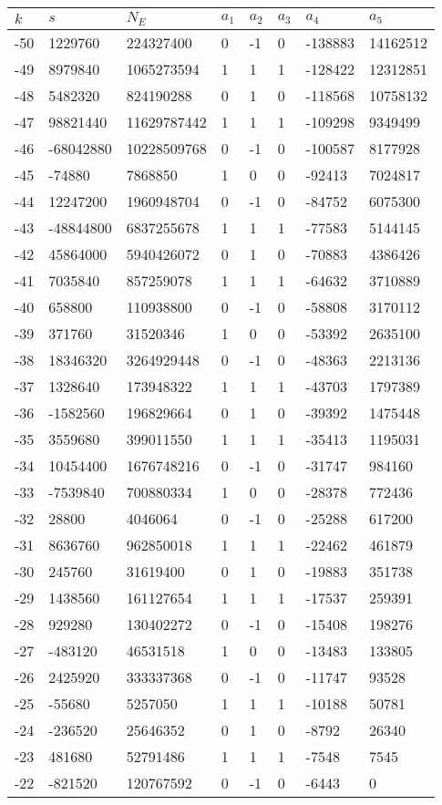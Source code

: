 \documentclass{amsart}
\begin{document}
\begin{longtable}{|l|l|l|lllll|}
\hline
$k$ & $s$ & $N_E$ & $a_1$ & $a_2$ & $a_3$ & $a_4$ & $a_5$\\
\hline
-50&1229760&224327400&0&-1&0&-138883&14162512\\
-49&8979840&1065273594&1&1&1&-128422&12312851\\
-48&5482320&824190288&0&1&0&-118568&10758132\\
-47&98821440&11629787442&1&1&1&-109298&9349499\\
-46&-68042880&10228509768&0&-1&0&-100587&8177928\\
-45&-74880&7868850&1&0&0&-92413&7024817\\
-44&12247200&1960948704&0&-1&0&-84752&6075300\\
-43&-48844800&6837255678&1&1&1&-77583&5144145\\
-42&45864000&5940426072&0&1&0&-70883&4386426\\
-41&7035840&857259078&1&1&1&-64632&3710889\\
-40&658800&110938800&0&-1&0&-58808&3170112\\
-39&371760&31520346&1&0&0&-53392&2635100\\
-38&18346320&3264929448&0&-1&0&-48363&2213136\\
-37&1328640&173948322&1&1&1&-43703&1797389\\
-36&-1582560&196829664&0&1&0&-39392&1475448\\
-35&3559680&399011550&1&1&1&-35413&1195031\\
-34&10454400&1676748216&0&-1&0&-31747&984160\\
-33&-7539840&700880334&1&0&0&-28378&772436\\
-32&28800&4046064&0&-1&0&-25288&617200\\
-31&8636760&962850018&1&1&1&-22462&461879\\
-30&245760&31619400&0&1&0&-19883&351738\\
-29&1438560&161127654&1&1&1&-17537&259391\\
-28&929280&130402272&0&-1&0&-15408&198276\\
-27&-483120&46531518&1&0&0&-13483&133805\\
-26&2425920&333337368&0&-1&0&-11747&93528\\
-25&-55680&5257050&1&1&1&-10188&50781\\
-24&-236520&25646352&0&1&0&-8792&26340\\
-23&481680&52791486&1&1&1&-7548&7545\\
-22&-821520&120767592&0&-1&0&-6443&0\\

\end{longtable}
\end{document}
